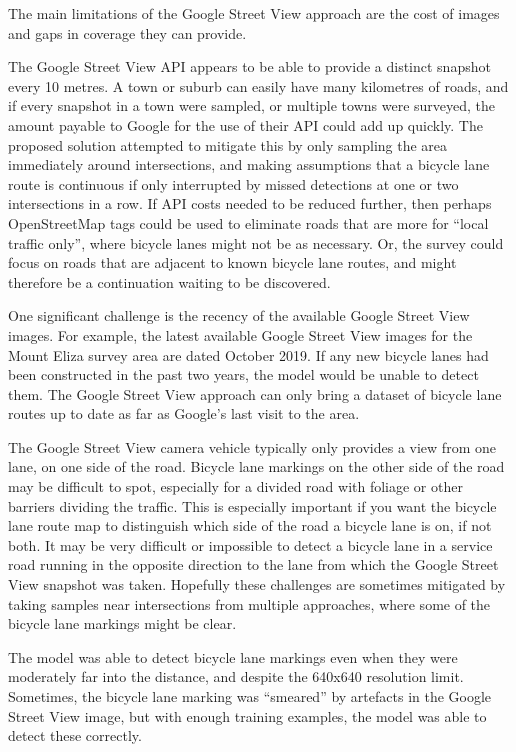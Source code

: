 \documentclass[11pt,twoside]{report}
\begin{document}
The main limitations of the Google Street View approach are the cost of images and gaps in coverage they can provide.

The Google Street View API appears to be able to provide a distinct snapshot every 10 metres.  A town or suburb can easily have many kilometres of roads, and if every snapshot in a town were sampled, or multiple towns were surveyed, the amount payable to Google for the use of their API could add up quickly.  The proposed solution attempted to mitigate this by only sampling the area immediately around intersections, and making assumptions that a bicycle lane route is continuous if only interrupted by missed detections at one or two intersections in a row.  If API costs needed to be reduced further, then perhaps OpenStreetMap tags could be used to eliminate roads that are more for ``local traffic only'', where bicycle lanes might not be as necessary.  Or, the survey could focus on roads that are adjacent to known bicycle lane routes, and might therefore be a continuation waiting to be discovered.

One significant challenge is the recency of the available Google Street View images.  For example, the latest available Google Street View images for the Mount Eliza survey area are dated October 2019.  If any new bicycle lanes had been constructed in the past two years, the model would be unable to detect them.  The Google Street View approach can only bring a dataset of bicycle lane routes up to date as far as Google's last visit to the area.

The Google Street View camera vehicle typically only provides a view from one lane, on one side of the road.  Bicycle lane markings on the other side of the road may be difficult to spot, especially for a divided road with foliage or other barriers dividing the traffic.  This is especially important if you want the bicycle lane route map to distinguish which side of the road a bicycle lane is on, if not both.  It may be very difficult or impossible to detect a bicycle lane in a service road running in the opposite direction to the lane from which the Google Street View snapshot was taken.  Hopefully these challenges are sometimes mitigated by taking samples near intersections from multiple approaches, where some of the bicycle lane markings might be clear.

The model was able to detect bicycle lane markings even when they were moderately far into the distance, and despite the 640x640 resolution limit.  Sometimes, the bicycle lane marking was ``smeared'' by artefacts in the Google Street View image, but with enough training examples, the model was able to detect these correctly.
\end{document}
